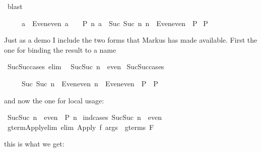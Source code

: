 \begin{isabellebody}
\begin{isamarkuptxt}
\end{isamarkuptxt}%
\isamarkupfalse%
\ blast\isanewline
\isamarkupfalse%
%
\endisatagproof
{\isafoldproof}%
%
\isadelimproof
%
\endisadelimproof
\isamarkuptrue%
%
\begin{isamarkuptext}%
\begin{isabelle}%
\ \ \ \ \ {\isasymlbrakk}a\ {\isasymin}\ Even{\isachardot}even{\isacharsemicolon}\ a\ {\isacharequal}\ {}\ {\isasymLongrightarrow}\ P{\isacharsemicolon}\ {\isasymAnd}n{\isachardot}\ {\isasymlbrakk}a\ {\isacharequal}\ Suc\ {\isacharparenleft}Suc\ n{\isacharparenright}{\isacharsemicolon}\ n\ {\isasymin}\ Even{\isachardot}even{\isasymrbrakk}\ {\isasymLongrightarrow}\ P{\isasymrbrakk}\isanewline
\isaindent{\ \ \ \ \ }{\isasymLongrightarrow}\ P%
\end{isabelle}

Just as a demo I include
the two forms that Markus has made available. First the one for binding the
result to a name%
\end{isamarkuptext}%
\isamarkupfalse%
\ Suc{\isacharunderscore}Suc{\isacharunderscore}cases\ {\isacharbrackleft}elim{\isacharbang}{\isacharbrackright}{\isacharcolon}\isanewline
\ \ {\isachardoublequote}Suc{\isacharparenleft}Suc\ n{\isacharparenright}\ {\isasymin}\ even{\isachardoublequote}\isanewline
\isanewline
\isamarkupfalse%
\ Suc{\isacharunderscore}Suc{\isacharunderscore}cases\isamarkuptrue%
%
\begin{isamarkuptext}%
\begin{isabelle}%
\ \ \ \ \ {\isasymlbrakk}Suc\ {\isacharparenleft}Suc\ n{\isacharparenright}\ {\isasymin}\ Even{\isachardot}even{\isacharsemicolon}\ n\ {\isasymin}\ Even{\isachardot}even\ {\isasymLongrightarrow}\ P{\isasymrbrakk}\ {\isasymLongrightarrow}\ P%
\end{isabelle}

and now the one for local usage:%
\end{isamarkuptext}%
\isamarkupfalse%
\ {\isachardoublequote}Suc{\isacharparenleft}Suc\ n{\isacharparenright}\ {\isasymin}\ even\ {\isasymLongrightarrow}\ P\ n{\isachardoublequote}\isanewline
%
\isadelimproof
%
\endisadelimproof
%
\isatagproof
\isamarkupfalse%
\ {\isacharparenleft}ind{\isacharunderscore}cases\ {\isachardoublequote}Suc{\isacharparenleft}Suc\ n{\isacharparenright}\ {\isasymin}\ even{\isachardoublequote}{\isacharparenright}\isanewline
\isamarkupfalse%
%
\endisatagproof
{\isafoldproof}%
%
\isadelimproof
\isanewline
%
\endisadelimproof
\isanewline
\isamarkupfalse%
\ gterm{\isacharunderscore}Apply{\isacharunderscore}elim\ {\isacharbrackleft}elim{\isacharbang}{\isacharbrackright}{\isacharcolon}\ {\isachardoublequote}Apply\ f\ args\ {\isasymin}\ gterms\ F{\isachardoublequote}\isamarkuptrue%
%
\begin{isamarkuptext}%
this is what we get:


\end{isamarkuptext}
\end{isabellebody}
